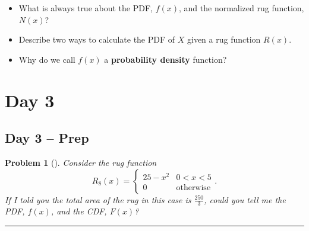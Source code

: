 \documentclass[letterpaper,oneside]{book}%
\theoremstyle{plain}
\theoremstyle{box}
\theoremstyle{problem}
\newtheorem{problemnum}{Problem}[chapter]
\newenvironment{problem}[1][]{\begin{problemnum}[#1]}{\end{problemnum}\nopagebreak\hrule\bigskip}
\begin{document}
\begin{itemize}
\item What is always true about the PDF, $f(x)$, and the normalized rug function, $N(x)$?
\item Describe two ways to calculate the PDF of $X$ given a rug function $R(x)$.
\item Why do we call $f(x)$ a \textbf{probability density} function?
\end{itemize}






\section{Day 3}
\subsection{Day 3 -- Prep}
\begin{problem}
\label{D3_inconventArea}
Consider the rug function 
$$R_8(x) = 
    \begin{cases}
    25-x^2 & 0 < x < 5 \\
    0 & \text{otherwise}
    \end{cases}.$$
If I told you the total area of the rug in this case is $\frac{250}{3}$, could you tell me the PDF, $f(x)$, and the CDF, $F(x)$?
\end{problem}
\end{document}
